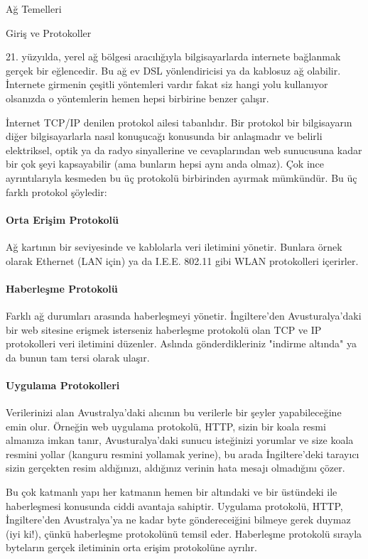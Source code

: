 \begin{section}{Ağ Temelleri}
\begin{subsection}{Giriş ve Protokoller}

21. yüzyılda, yerel ağ bölgesi aracılığıyla bilgisayarlarda internete bağlanmak gerçek bir eğlencedir. Bu ağ ev DSL yönlendiricisi ya da kablosuz ağ olabilir.
İnternete girmenin çeşitli yöntemleri vardır fakat siz hangi yolu kullanıyor olsanızda o yöntemlerin hemen hepsi birbirine benzer çalışır.

İnternet TCP/IP denilen protokol ailesi tabanlıdır. Bir protokol bir bilgisayarın diğer bilgisayarlarla nasıl konuşucağı konusunda bir anlaşmadır ve belirli elektriksel, optik ya da radyo sinyallerine ve cevaplarından web sunucusuna kadar bir çok şeyi kapsayabilir (ama bunların hepsi aynı anda olmaz). Çok ince ayrıntılarıyla kesmeden bu üç protokolü birbirinden ayırmak mümkündür. Bu üç farklı protokol şöyledir:

\paragraph{Orta Erişim Protokolü}{Ağ kartının bir seviyesinde ve kablolarla veri iletimini yönetir. Bunlara örnek olarak Ethernet (LAN için) ya da I.E.E. 802.11 gibi WLAN protokolleri içerirler. } 

\paragraph{Haberleşme Protokolü}{Farklı ağ durumları arasında haberleşmeyi yönetir. İngiltere'den Avusturalya'daki bir web sitesine erişmek isterseniz haberleşme protokolü olan TCP ve IP protokolleri veri iletimini düzenler. Aslında gönderdikleriniz "indirme altında" ya da bunun tam tersi olarak ulaşır.}

\paragraph{Uygulama Protokolleri}{Verilerinizi alan Avustralya'daki alıcının bu verilerle bir şeyler yapabileceğine emin olur. Örneğin web uygulama protokolü, HTTP, sizin bir koala resmi almanıza imkan tanır, Avusturalya'daki sunucu isteğinizi yorumlar ve size koala resmini yollar (kanguru resmini yollamak yerine), bu arada İngiltere'deki tarayıcı sizin gerçekten resim aldığınızı, aldığınız verinin hata mesajı olmadığını çözer.}

Bu çok katmanlı yapı her katmanın hemen bir altındaki ve bir üstündeki ile haberleşmesi konusunda ciddi avantaja sahiptir. Uygulama protokolü, HTTP, İngiltere'den Avustralya'ya ne kadar byte göndereceiğini bilmeye gerek duymaz (iyi ki!), çünkü haberleşme protokolünü temsil eder. Haberleşme protokolü sırayla byteların gerçek iletiminin orta erişim protokolüne ayrılır.


\end{subsection}
\end{section}
